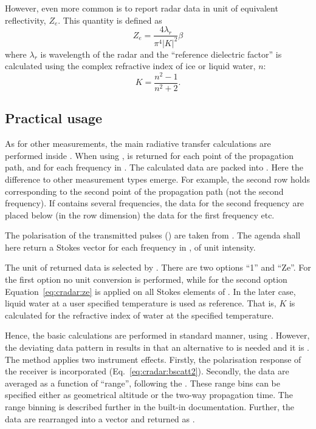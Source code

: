 However, even more common is to report radar data in unit of equivalent
reflectivity, $Z_e$. This quantity is defined as \citep[e.g.][]{donovan:01}
\begin{equation}
  \label{eq:cradar:ze}
  Z_e = \frac{4\lambda_r}{\pi^4|K|^2}\beta
\end{equation}
where $\lambda_r$ is wavelength of the radar and the ``reference dielectric
factor'' is calculated using the complex refractive index of ice or liquid
water, $n$:
\begin{equation}
  K = \frac{n^2-1}{n^2+2}.
\end{equation}



\subsection{Practical usage}
\label{sec:cradar:usage}

As for other measurements, the main radiative transfer calculations are
performed inside . When using
,  is returned
for each point of the propagation path, and for each frequency in
. The calculated data are packed into . Here
the difference to other measurement types emerge. For example, the second row
holds  corresponding to the second point of the propagation path
(not the second frequency). If  contains several
frequencies, the data for the second frequency are placed below (in the row
dimension) the data for the first frequency etc. 

The polarisation of the transmitted pulses () are taken from
. The agenda shall here return a Stokes
vector for each frequency in , of unit intensity.

The unit of returned data is selected by . There are two
options ``1'' and ``Ze''. For the first option no unit conversion is performed,
while for the second option Equation~\ref{eq:cradar:ze} is applied on all
Stokes elements of . In the later case, liquid water at a user
specified temperature is used as reference. That is, $K$ is calculated for the
refractive index of water at the specified temperature.

Hence, the basic calculations are performed in standard manner, using
. However, the deviating data pattern in
 results in that an alternative to  is needed
and it is . The method applies two instrument effects.
Firstly, the polarisation response of the receiver is incorporated
(Eq.~\ref{eq:cradar:bscatt2}). Secondly, the data are averaged as a
function of ``range'', following the . These range bins
can be specified either as geometrical altitude or the two-way propagation time.
The range binning is described further in the built-in documentation.
Further, the data are rearranged into a vector and returned as .

